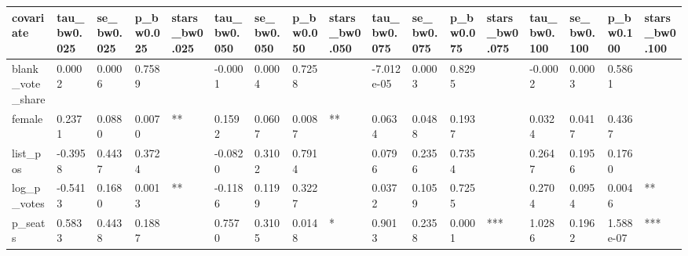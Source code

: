 \begin{tabular}{lllllllllllllllll}
\toprule
covariate & tau\_bw0.025 & se\_bw0.025 & p\_bw0.025 & stars\_bw0.025 & tau\_bw0.050 & se\_bw0.050 & p\_bw0.050 & stars\_bw0.050 & tau\_bw0.075 & se\_bw0.075 & p\_bw0.075 & stars\_bw0.075 & tau\_bw0.100 & se\_bw0.100 & p\_bw0.100 & stars\_bw0.100 \\
\midrule
blank\_vote\_share & 0.0002 & 0.0006 & 0.7589 &  & -0.0001 & 0.0004 & 0.7258 &  & -7.012e-05 & 0.0003 & 0.8295 &  & -0.0002 & 0.0003 & 0.5861 &  \\
female & 0.2371 & 0.0880 & 0.0070 & ** & 0.1592 & 0.0607 & 0.0087 & ** & 0.0634 & 0.0488 & 0.1937 &  & 0.0324 & 0.0417 & 0.4367 &  \\
list\_pos & -0.3958 & 0.4437 & 0.3724 &  & -0.0820 & 0.3102 & 0.7914 &  & 0.0796 & 0.2356 & 0.7354 &  & 0.2647 & 0.1956 & 0.1760 &  \\
log\_p\_votes & -0.5413 & 0.1680 & 0.0013 & ** & -0.1186 & 0.1199 & 0.3227 &  & 0.0372 & 0.1059 & 0.7255 &  & 0.2704 & 0.0954 & 0.0046 & ** \\
p\_seats & 0.5833 & 0.4438 & 0.1887 &  & 0.7570 & 0.3105 & 0.0148 & * & 0.9013 & 0.2358 & 0.0001 & *** & 1.0286 & 0.1962 & 1.588e-07 & *** \\
\bottomrule
\end{tabular}
